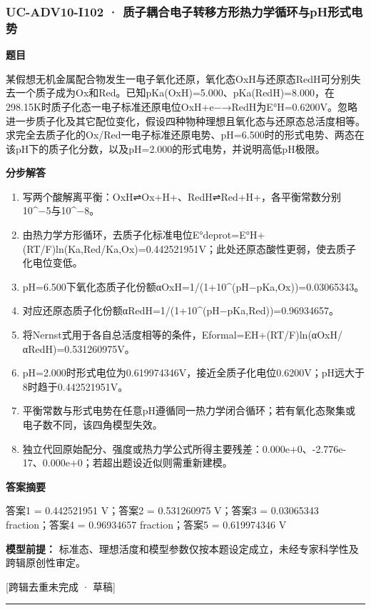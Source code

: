 \documentclass[UTF8,11pt,a4paper]{ctexart}
\begin{document}
\subsubsection*{UC-ADV10-I102 · 质子耦合电子转移方形热力学循环与pH形式电势}
\noindent\textbf{题目}\par
某假想无机金属配合物发生一电子氧化还原，氧化态OxH与还原态RedH可分别失去一个质子成为Ox和Red。已知pKa(OxH)=5.000、pKa(RedH)=8.000，在298.15K时质子化态一电子标准还原电位OxH+e−→RedH为E°H=0.6200V。忽略进一步质子化及其它配位变化，假设四种物种理想且氧化态与还原态总活度相等。求完全去质子化的Ox/Red一电子标准还原电势、pH=6.500时的形式电势、两态在该pH下的质子化分数，以及pH=2.000的形式电势，并说明高低pH极限。\par
\medskip\noindent\textbf{分步解答}
\begin{enumerate}
\item 写两个酸解离平衡：OxH⇌Ox+H+、RedH⇌Red+H+，各平衡常数分别10\textasciicircum{}−5与10\textasciicircum{}−8。
\item 由热力学方形循环，去质子化标准电位E°deprot=E°H+(RT/F)ln(Ka,Red/Ka,Ox)=0.442521951V；此处还原态酸性更弱，使去质子化电位变低。
\item pH=6.500下氧化态质子化份额αOxH=1/(1+10\textasciicircum{}(pH−pKa,Ox))=0.03065343。
\item 对应还原态质子化份额αRedH=1/(1+10\textasciicircum{}(pH−pKa,Red))=0.96934657。
\item 将Nernst式用于各自总活度相等的条件，Eformal=EH+(RT/F)ln(αOxH/αRedH)=0.531260975V。
\item pH=2.000时形式电位为0.619974346V，接近全质子化电位0.6200V；pH远大于8时趋于0.442521951V。
\item 平衡常数与形式电势在任意pH遵循同一热力学闭合循环；若有氧化态聚集或电子数不同，该四角模型失效。
\item 独立代回原始配分、强度或热力学公式所得主要残差：0.000e+0、-2.776e-17、0.000e+0；若超出题设近似则需重新建模。
\end{enumerate}
\noindent\textbf{答案摘要}\par
答案1 = 0.442521951 V；答案2 = 0.531260975 V；答案3 = 0.03065343 fraction；答案4 = 0.96934657 fraction；答案5 = 0.619974346 V\par
\noindent\textbf{模型前提：}
标准态、理想活度和模型参数仅按本题设定成立，未经专家科学性及跨辑原创性审定。\par
\noindent\textcolor{red!65!black}{[跨辑去重未完成 · 草稿]} \par
\medskip\hrule\medskip
{}
\end{document}
